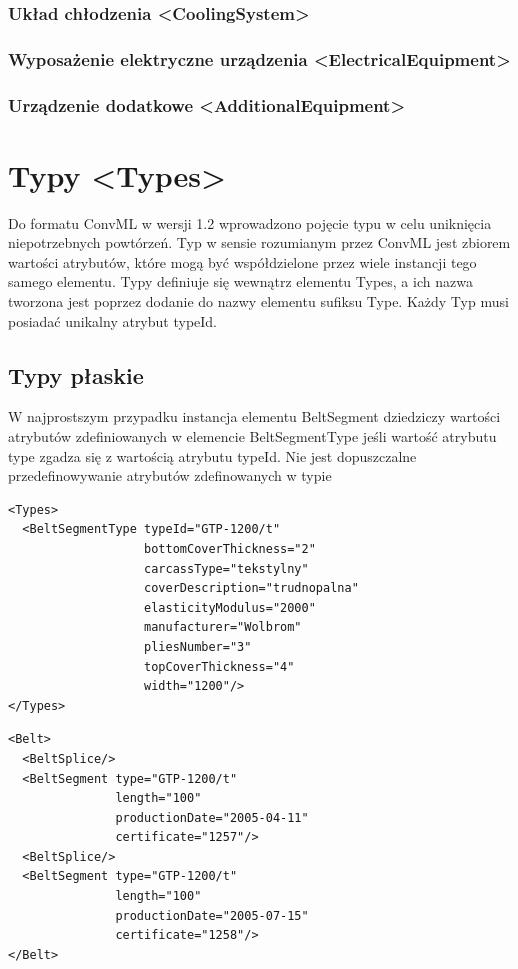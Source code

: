 \documentclass[12pt,a4paper]{article}
\begin{document}
\subsubsection{Układ chłodzenia <CoolingSystem>}

\subsubsection{Wyposażenie elektryczne urządzenia <ElectricalEquipment>}

\subsubsection{Urządzenie dodatkowe <AdditionalEquipment>}

\section{Typy <Types>}
Do formatu ConvML w wersji 1.2 wprowadzono pojęcie typu w celu uniknięcia
niepotrzebnych powtórzeń.  Typ w sensie rozumianym przez ConvML jest zbiorem
wartości atrybutów, które mogą być współdzielone przez wiele instancji tego
samego elementu.  Typy definiuje się wewnątrz elementu Types, a ich nazwa
tworzona jest poprzez dodanie do nazwy elementu sufiksu Type. Każdy Typ musi
posiadać unikalny atrybut typeId.


\subsection{Typy płaskie}
W najprostszym przypadku instancja elementu BeltSegment dziedziczy wartości
atrybutów zdefiniowanych w
elemencie BeltSegmentType jeśli wartość atrybutu type zgadza się z wartością
atrybutu typeId.  Nie jest dopuszczalne przedefinowywanie atrybutów zdefinowanych
w typie

\begin{verbatim}
<Types>
  <BeltSegmentType typeId="GTP-1200/t"
                   bottomCoverThickness="2"
                   carcassType="tekstylny"
                   coverDescription="trudnopalna"
                   elasticityModulus="2000"
                   manufacturer="Wolbrom"
                   pliesNumber="3"
                   topCoverThickness="4"
                   width="1200"/>
</Types>
\end{verbatim}

\begin{verbatim}
<Belt>
  <BeltSplice/>
  <BeltSegment type="GTP-1200/t"
               length="100"
               productionDate="2005-04-11"
               certificate="1257"/>
  <BeltSplice/>
  <BeltSegment type="GTP-1200/t"
               length="100"
               productionDate="2005-07-15"
               certificate="1258"/>
</Belt>
\end{verbatim}
\end{document}
